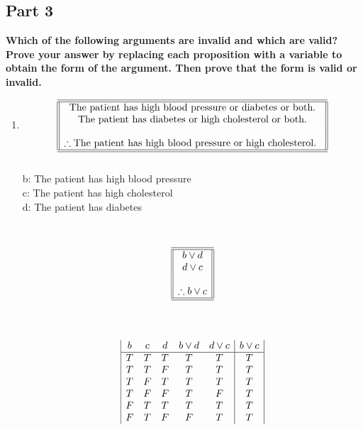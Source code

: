 \documentclass{amsart}
\theoremstyle{definition}
\theoremstyle{Exercise}
\theoremstyle{remark}
\theoremstyle{rule}
\numberwithin{equation}{section}
\begin{document}
\subsection*{Part 3}
{\bf Which of the following arguments are invalid and which are valid? Prove your answer by replacing each proposition with a variable to obtain the form of the argument. Then prove that the form is valid or invalid.}\\
 \begin{enumerate}[label=(\alph*)]
  \item \[
\begin{array}{||c||}
\hline \hline
\text{The patient has high blood pressure or diabetes or both.}\\
\text {The patient has diabetes or high cholesterol or both.}\\
\\
\therefore \text {The patient has high blood pressure or high cholesterol.
}\\
\hline \hline
\end{array}
\]
\vspace*{1in}\\
b: The patient has high blood pressure\\
c: The patient has high cholesterol\\
d: The patient has diabetes\\
\\\\
\[
\begin{array}{||c||}
  \hline \hline
  b \lor d\\
  d \lor c\\
  \\
  \therefore b \lor c\\
  \hline \hline
\end{array}
\]\\\\
\begin{displaymath}
  \begin{array}{| c c c c c | c |}
    b & c & d & b\lor d & d \lor c & b \lor c\\
    \hline
    T & T & T & T & T & T\\
    T & T & F & T & T & T\\
    T & F & T & T & T & T\\
    T & F & F & T & F & T\\
    F & T & T & T & T & T\\
    F & T & F & F & T & T\\

\end{array}
\end{displaymath}
\end{enumerate}
\end{document}
